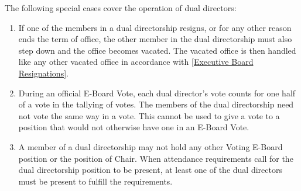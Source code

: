 \documentclass{article}
\begin{document}
The following special cases cover the operation of dual directors:
\begin{enumerate}
	\item If one of the members in a dual directorship resigns, or for any other reason ends the term of office, the other member in the dual directorship must also step down and the office becomes vacated.
	      The vacated office is then handled like any other vacated office in accordance with \ref{Executive Board Resignations}.
	\item During an official E-Board Vote, each dual director's vote counts for one half of a vote in the tallying of votes.
	      The members of the dual directorship need not vote the same way in a vote.
	      This cannot be used to give a vote to a position that would not otherwise have one in an E-Board Vote.
	\item A member of a dual directorship may not hold any other Voting E-Board position or the position of Chair.
	      When attendance requirements call for the dual directorship position to be present, at least one of the dual directors must be present to fulfill the requirements.
\end{enumerate}
\end{document}
